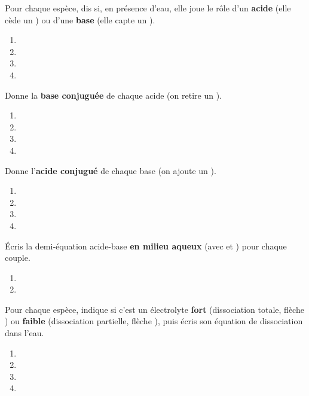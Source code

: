 \documentclass[11pt,a4paper]{article}
\begin{document}

\begin{exo}
Pour chaque espèce, dis si, en présence d'eau, elle joue le rôle d'un \textbf{acide} (elle cède un ) ou
d'une \textbf{base} (elle capte un ).
\begin{enumerate}[label=\alph*)]
  \item {}
  \item {}
  \item {}
  \item {}
\end{enumerate}
\end{exo}

\begin{exo}
Donne la \textbf{base conjuguée} de chaque acide (on retire un ).
\begin{enumerate}[label=\alph*)]
  \item {}
  \item {}
  \item {}
  \item {}
\end{enumerate}
\end{exo}

\begin{exo}
Donne l'\textbf{acide conjugué} de chaque base (on ajoute un ).
\begin{enumerate}[label=\alph*)]
  \item {}
  \item {}
  \item {}
  \item {}
\end{enumerate}
\end{exo}

\begin{exo}
Écris la demi-équation acide-base \textbf{en milieu aqueux} (avec  et ) pour chaque couple.
\begin{enumerate}[label=\alph*)]
  \item {}
  \item {}
\end{enumerate}
\end{exo}

\begin{exo}
Pour chaque espèce, indique si c'est un électrolyte \textbf{fort} (dissociation totale, flèche \ce{->}) ou
\textbf{faible} (dissociation partielle, flèche \ce{<=>}), puis écris son équation de dissociation dans l'eau.
\begin{enumerate}[label=\alph*)]
  \item {}
  \item {}
  \item {}
  \item {}
\end{enumerate}
\end{exo}
\end{document}
